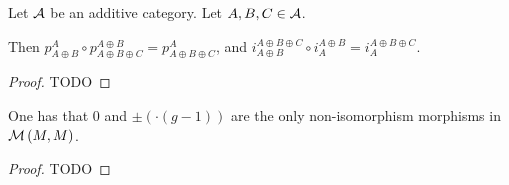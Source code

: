 \begin{lemma} \label{lem:projection_unique} %
    Let \( {\mathcal{A}} \) be an additive category. Let \( A, B, C \in {\mathcal{A}} \).

    Then \( p_{A \oplus B}^A \circ p_{A \oplus B \oplus C}^{A \oplus B} = p_{A \oplus B \oplus C}^A \), and \( i_{A \oplus B}^{A \oplus B \oplus C} \circ i_A^{A \oplus B} = i_A^{A \oplus B \oplus C} \).
\end{lemma}
\begin{proof}
    TODO
\end{proof}

\begin{lemma} \label{lem:only_non_surjective_M_to_M}
    One has that \( 0 \) and \( \pm(\cdot(g - 1)) \) are the only non-isomorphism morphisms in \( {\mathcal{M}}\left( M, M \right) \).
\end{lemma}
\begin{proof}
    TODO
\end{proof}

